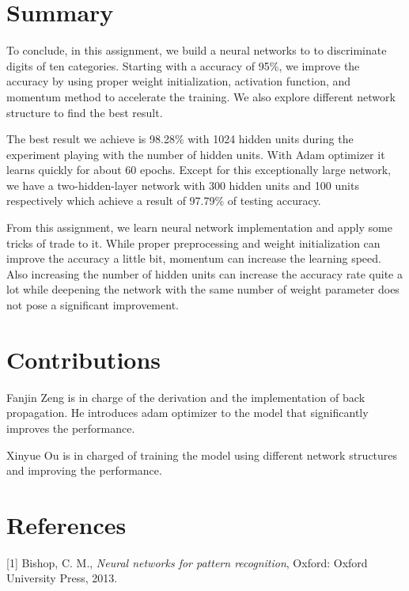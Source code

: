 \documentclass{article}
\begin{document}
\newpage
\section{Summary}
To conclude, in this assignment, we build a neural networks to to discriminate digits of ten categories. Starting with a accuracy of 95\%, we improve the accuracy by using proper weight initialization, activation function, and momentum method to accelerate the training. We also explore different network structure to find the best result. 

The best result we achieve is 98.28\% with 1024 hidden units during the experiment playing with the number of hidden units.  With Adam optimizer it learns quickly for about 60 epochs.
Except for this exceptionally large network, we have a two-hidden-layer network with 300 hidden units and 100 units respectively which achieve a result of 97.79\% of testing accuracy.

From this assignment, we learn neural network implementation and apply some tricks of trade to it. While proper preprocessing and weight initialization can improve the accuracy a little bit, momentum can increase the learning speed. Also increasing the number of hidden units can increase the accuracy rate quite a lot while deepening the network with the same number of weight parameter does not pose a significant improvement.
\section{Contributions}
Fanjin Zeng is in charge of the derivation and the implementation of back propagation. He introduces adam optimizer to the model that significantly improves the performance. 

Xinyue Ou is in charged of training the model using different network structures and improving the performance.


\section{References}
[1] Bishop, C. M., {\it Neural networks for pattern recognition}, Oxford: Oxford University Press, 2013.
\end{document}
